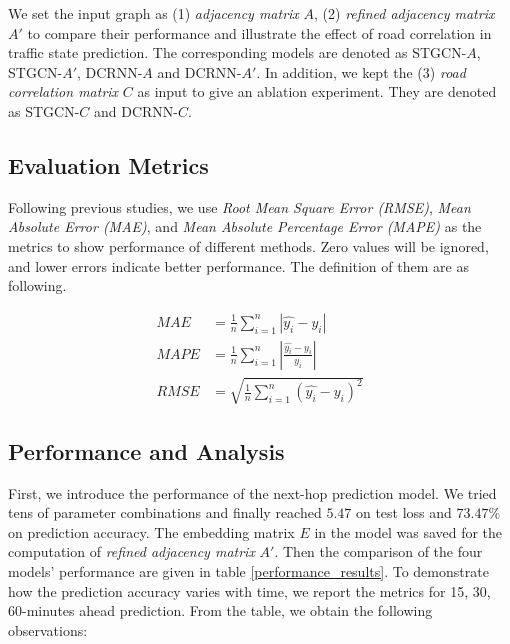 We set the input graph as (1) \textit{adjacency matrix} $A$, (2) \textit{refined adjacency matrix} $A'$ to compare their performance and illustrate the effect of road correlation in traffic state prediction. The corresponding models are denoted as STGCN-$A$, STGCN-$A'$, DCRNN-$A$ and DCRNN-$A'$. In addition, we kept the (3) \textit{road correlation matrix} $C$ as input to give an ablation experiment. They are denoted as STGCN-$C$ and DCRNN-$C$.

\subsection{Evaluation Metrics}
Following previous studies, we use \textit{Root Mean Square Error (RMSE)}, \textit{Mean Absolute Error (MAE)}, and \textit{Mean Absolute Percentage Error (MAPE)} as the metrics to show performance of different methods. Zero values will be ignored, and lower errors indicate better performance. The definition of them are as following.

\begin{equation}
    \begin{aligned}
        MAE&=\frac 1n\sum_{i=1}^n|\hat{y_i}-y_i|\\
        MAPE&=\frac 1n\sum_{i=1}^n|\frac{\hat{y_i}-y_i}{y_i}|\\
        RMSE&=\sqrt{\frac 1n\sum_{i=1}^n(\hat{y_i}-y_i)^2}
    \end{aligned}
\end{equation}

\subsection{Performance and Analysis}
First, we introduce the performance of the next-hop prediction model. We tried tens of parameter combinations and finally reached $5.47$ on test loss and $73.47\%$ on prediction accuracy. The embedding matrix $E$ in the model was saved for the computation of \textit{refined adjacency matrix} $A'$. Then the comparison of the four models' performance are given in table \ref{performance_results}. To demonstrate how the prediction accuracy varies with time, we report the metrics for 15, 30, 60-minutes ahead prediction. From the table, we obtain the following observations:

